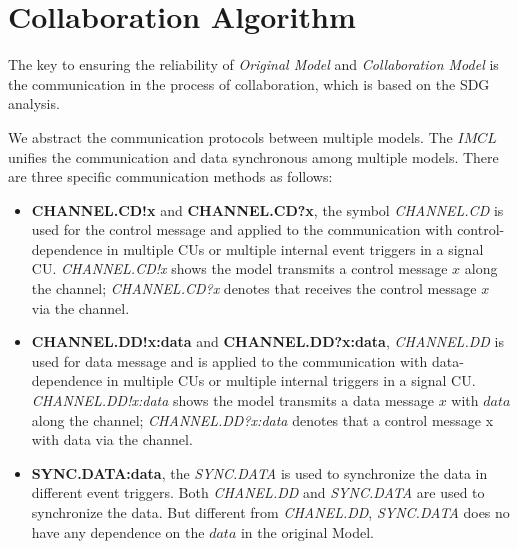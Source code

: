 \section{Collaboration Algorithm}

The key to ensuring the reliability of \emph{Original Model} and \emph{Collaboration Model} is the communication in the process of collaboration, which is based on the SDG analysis.

We abstract the communication protocols between multiple models. The $IMCL$  unifies the communication and data synchronous among multiple models. There are three specific communication methods as follows:
\begin{itemize}
  \item \textbf{CHANNEL.CD!x} and \textbf{CHANNEL.CD?x},  the symbol \emph{CHANNEL.CD} is used for the control message and applied to the communication with control-dependence in multiple CUs or multiple internal event triggers in a signal CU. \emph{CHANNEL.CD!x} shows the model transmits a control message $x$ along the channel; \emph{CHANNEL.CD?x} denotes that receives the control message $x$ via the channel.
  \item \textbf{CHANNEL.DD!x:data} and \textbf{CHANNEL.DD?x:data},  \emph{CHANNEL.DD} is used for data message and is applied to the communication with data-dependence in multiple CUs or multiple internal triggers in a signal CU. \emph{CHANNEL.DD!x:data} shows the model transmits a data message $x$ with $data$ along the channel; \emph{CHANNEL.DD?x:data} denotes that a control message x with data via the channel.
  \item \textbf{SYNC.DATA:data},  the \emph{SYNC.DATA} is used to synchronize the data in different event triggers. Both \emph{CHANEL.DD} and \emph{SYNC.DATA} are used to synchronize the data. But different from \emph{CHANEL.DD}, \emph{SYNC.DATA} does no have any dependence on the $data$ in the original Model.
\end{itemize}

